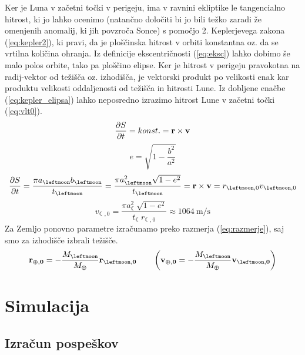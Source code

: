 \documentclass{article}
\begin{document}
Ker je Luna v začetni točki v perigeju, ima v ravnini ekliptike le tangencialno hitrost, ki jo lahko ocenimo (natančno določiti bi jo bili težko zaradi že omenjenih anomalij, ki jih povzroča Sonce) s pomočjo 2. Keplerjevega zakona (\ref{eq:kepler2}), ki pravi, da je ploščinska hitrost v orbiti konstantna oz. da se vrtilna količina ohranja. Iz definicije ekscentričnosti (\ref{eq:eksc}) lahko dobimo še malo polos orbite, tako pa ploščino elipse. Ker je hitrost v perigeju pravokotna na radij-vektor od težišča oz. izhodišča, je vektorski produkt po velikosti enak kar produktu velikosti oddaljenosti od težišča in hitrosti Lune. Iz dobljene enačbe (\ref{eq:kepler_elipsa}) lahko neposredno izrazimo hitrost Lune v začetni točki (\ref{eq:vlt0}).
\begin{equation}
    \frac{\partial{S}}{\partial{t}}=konst.={\bf r\times v}
    \label{eq:kepler2}
\end{equation}
\begin{equation} \label{eq:eksc}
    e=\sqrt{1-\frac{b^2}{a^2}}
\end{equation}
\begin{equation}\label{eq:kepler_elipsa}
    \frac{\partial{S}}{\partial{t}}=\frac{\pi a_\leftmoon b_\leftmoon}{t_\leftmoon}=\frac{\pi a_\leftmoon^2\sqrt{1-e^2}}{t_\leftmoon}={\bf r\times v}= r_{\leftmoon,0}v_{\leftmoon,0}    
\end{equation}
\begin{equation}\label{eq:vlt0}
    v_{\leftmoon,0}=\frac{\pi a_\leftmoon^2\sqrt{1-e^2}}{t_\leftmoon r_{\leftmoon,0}}\approx\SI{1064}{\meter\per\second}
\end{equation}
Za Zemljo ponovno parametre izračunamo preko razmerja (\ref{eq:razmerje}), saj smo za izhodišče izbrali težišče.
\begin{equation}\label{eq:razmerje}
    {\bf r_{\varoplus, 0}} = -\frac{M_\leftmoon}{M_\varoplus}{\bf r_{\leftmoon, 0}} \qquad \left({\bf v_{\varoplus, 0}} = -\frac{M_\leftmoon}{M_\varoplus}{\bf v_{\leftmoon, 0}}\right)
\end{equation}

\section{Simulacija}
\subsection{Izračun pospeškov}
\end{document}
